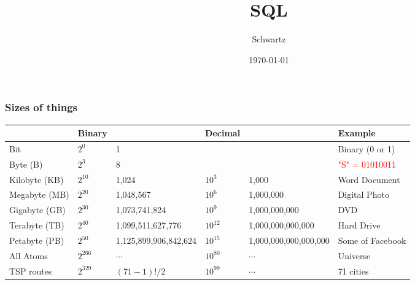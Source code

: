 \documentclass[xcolor={dvipsnames}]{beamer}
\title{SQL}
\author{Schwartz}
\date{\today}
\begin{document}
\frame{\titlepage}






\frame
{
 \frametitle{Sizes of things}
 
 \vspace{.2em}
 
 \tiny
 \begin{tabular}{|l|lllll|}\hline
  & Binary   &   & Decimal  && Example\\\hline
Bit   & $2^0$ &   1 &                &        &      Binary (0 or 1) \\
Byte (B) & $2^3$ &  8 &          &             & \textcolor{red}{"S" = 01010011} \\ \hline
Kilobyte (KB) & $2^{10}$ & 1,024 &  $10^3$ & 1,000 & Word Document \\
Megabyte (MB) & $2^{20}$ & 1,048,567 & $10^6$ & 1,000,000 &  Digital Photo \\  
Gigabyte (GB) & $2^{30}$ & 1,073,741,824 & $10^9$ & 1,000,000,000 &  DVD  \\
Terabyte (TB) &  $2^{40}$ &   1,099,511,627,776 & $10^{12}$  & 1,000,000,000,000 &  Hard Drive  \\
Petabyte (PB) & $2^{50}$ &    1,125,899,906,842,624 & $10^{15}$  & 1,000,000,000,000,000 & Some of Facebook  \\ \hline
All Atoms  &            $2^{266}$ &  $\cdots$      &$10^{80}$      & $\cdots$ & Universe    \\
TSP routes &       $2^{329}$ & $(71-1)!/2$ &$10^{99}$ & $\cdots$& 71 cities  \\\hline
 \end{tabular}

\vspace{-1.4em}

}
\end{document}
